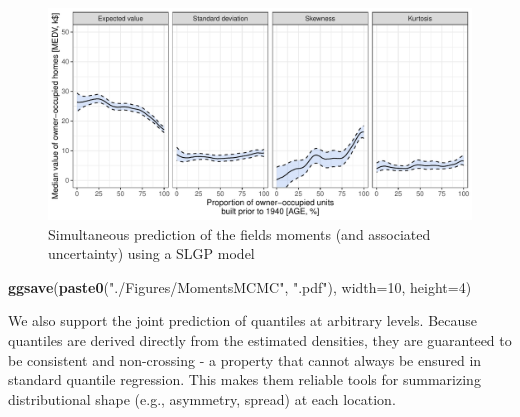 \documentclass[
]{article}
\newenvironment{Shaded}{\begin{snugshade}}{\end{snugshade}}
\newcommand{\AttributeTok}[1]{\textcolor[rgb]{0.13,0.29,0.53}{#1}}
\newcommand{\DecValTok}[1]{\textcolor[rgb]{0.00,0.00,0.81}{#1}}
\newcommand{\FunctionTok}[1]{\textcolor[rgb]{0.13,0.29,0.53}{\textbf{#1}}}
\newcommand{\NormalTok}[1]{#1}
\newcommand{\StringTok}[1]{\textcolor[rgb]{0.31,0.60,0.02}{#1}}
\begin{document}
\begin{figure}[H]

{\centering \includegraphics{IntroductionSLGP_files/figure-latex/SLGPMCMCplotMoments-1} 

}

\caption{Simultaneous prediction of the fields moments (and associated uncertainty) using a SLGP model}\label{fig:SLGPMCMCplotMoments}
\end{figure}

\begin{Shaded}
\begin{Highlighting}[]
\FunctionTok{ggsave}\NormalTok{(}\FunctionTok{paste0}\NormalTok{(}\StringTok{"./Figures/MomentsMCMC"}\NormalTok{,  }\StringTok{".pdf"}\NormalTok{), }\AttributeTok{width=}\DecValTok{10}\NormalTok{, }\AttributeTok{height=}\DecValTok{4}\NormalTok{)}
\end{Highlighting}
\end{Shaded}

We also support the joint prediction of quantiles at arbitrary levels. Because quantiles are derived directly from the estimated densities, they are guaranteed to be consistent and non-crossing - a property that cannot always be ensured in standard quantile regression. This makes them reliable tools for summarizing distributional shape (e.g., asymmetry, spread) at each location.
\end{document}
